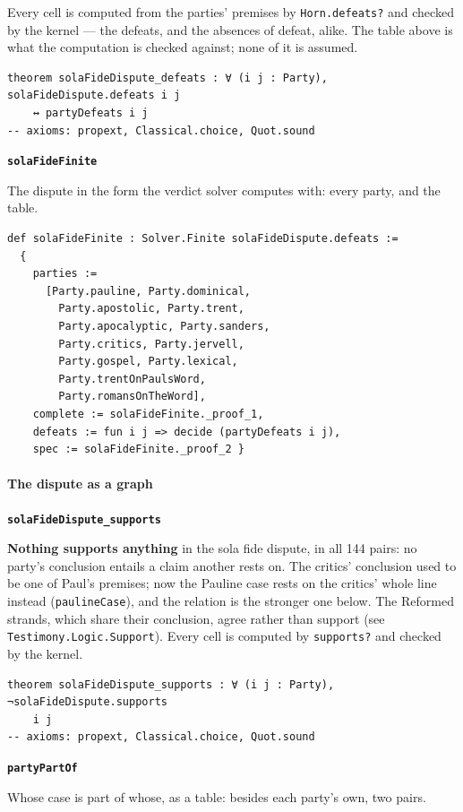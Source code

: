 \documentclass[11pt]{article}
\begin{document}
Every cell is computed from the parties' premises by \texttt{Horn.defeats?} and checked by the kernel — the defeats, and the absences of defeat, alike. The table above is what the computation is checked against; none of it is assumed.

{\small\begin{verbatim}
theorem solaFideDispute_defeats : ∀ (i j : Party), solaFideDispute.defeats i j
    ↔ partyDefeats i j
-- axioms: propext, Classical.choice, Quot.sound
\end{verbatim}}
\par\medskip\noindent\textbf{\texttt{sola\allowbreak{}Fide\allowbreak{}Finite}}\par\nobreak\noindent
The dispute in the form the verdict solver computes with: every party, and the table.

{\small\begin{verbatim}
def solaFideFinite : Solver.Finite solaFideDispute.defeats :=
  {
    parties :=
      [Party.pauline, Party.dominical,
        Party.apostolic, Party.trent,
        Party.apocalyptic, Party.sanders,
        Party.critics, Party.jervell,
        Party.gospel, Party.lexical,
        Party.trentOnPaulsWord,
        Party.romansOnTheWord],
    complete := solaFideFinite._proof_1,
    defeats := fun i j => decide (partyDefeats i j),
    spec := solaFideFinite._proof_2 }
\end{verbatim}}
\paragraph*{The dispute as a graph}
\leavevmode\par
\par\medskip\noindent\textbf{\texttt{sola\allowbreak{}Fide\allowbreak{}Dispute\_\allowbreak{}supports}}\par\nobreak\noindent
\textbf{Nothing supports anything} in the sola fide dispute, in all 144 pairs: no party's conclusion entails a claim another rests on. The critics' conclusion used to be one of Paul's premises; now the Pauline case rests on the critics' whole line instead (\texttt{pauline\allowbreak{}Case}), and the relation is the stronger one below. The Reformed strands, which share their conclusion, agree rather than support (see \texttt{Testimony.Logic.Support}). Every cell is computed by \texttt{supports?} and checked by the kernel.

{\small\begin{verbatim}
theorem solaFideDispute_supports : ∀ (i j : Party), ¬solaFideDispute.supports
    i j
-- axioms: propext, Classical.choice, Quot.sound
\end{verbatim}}
\par\medskip\noindent\textbf{\texttt{party\allowbreak{}Part\allowbreak{}Of}}\par\nobreak\noindent
Whose case is part of whose, as a table: besides each party's own, two pairs.
\end{document}
